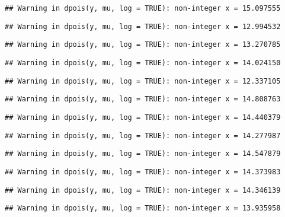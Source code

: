 \documentclass[
]{article}
\begin{document}
\begin{verbatim}
## Warning in dpois(y, mu, log = TRUE): non-integer x = 15.097555
\end{verbatim}

\begin{verbatim}
## Warning in dpois(y, mu, log = TRUE): non-integer x = 12.994532
\end{verbatim}

\begin{verbatim}
## Warning in dpois(y, mu, log = TRUE): non-integer x = 13.270785
\end{verbatim}

\begin{verbatim}
## Warning in dpois(y, mu, log = TRUE): non-integer x = 14.024150
\end{verbatim}

\begin{verbatim}
## Warning in dpois(y, mu, log = TRUE): non-integer x = 12.337105
\end{verbatim}

\begin{verbatim}
## Warning in dpois(y, mu, log = TRUE): non-integer x = 14.808763
\end{verbatim}

\begin{verbatim}
## Warning in dpois(y, mu, log = TRUE): non-integer x = 14.440379
\end{verbatim}

\begin{verbatim}
## Warning in dpois(y, mu, log = TRUE): non-integer x = 14.277987
\end{verbatim}

\begin{verbatim}
## Warning in dpois(y, mu, log = TRUE): non-integer x = 14.547879
\end{verbatim}

\begin{verbatim}
## Warning in dpois(y, mu, log = TRUE): non-integer x = 14.373983
\end{verbatim}

\begin{verbatim}
## Warning in dpois(y, mu, log = TRUE): non-integer x = 14.346139
\end{verbatim}

\begin{verbatim}
## Warning in dpois(y, mu, log = TRUE): non-integer x = 13.935958
\end{verbatim}
\end{document}
